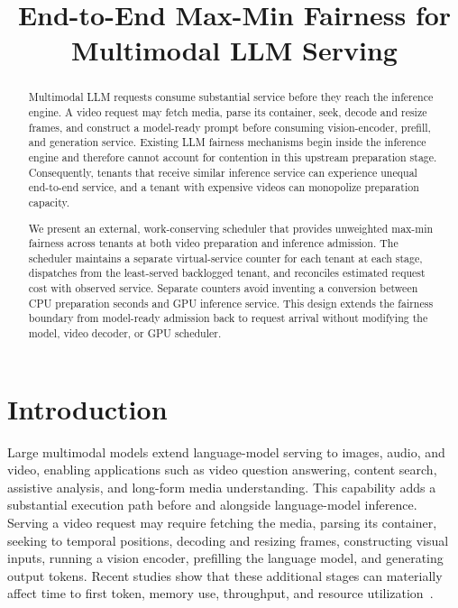 \documentclass[sigplan,anonymous,review,nonacm]{acmart}
\title{End-to-End Max-Min Fairness for Multimodal LLM Serving}
\begin{document}
\begin{abstract}
Multimodal LLM requests consume substantial service before they reach the
inference engine. A video request may fetch media, parse its container, seek,
decode and resize frames, and construct a model-ready prompt before consuming
vision-encoder, prefill, and generation service. Existing LLM fairness
mechanisms begin inside the inference engine and therefore cannot account for
contention in this upstream preparation stage. Consequently, tenants that
receive similar inference service can experience unequal end-to-end service,
and a tenant with expensive videos can monopolize preparation capacity.

We present an external, work-conserving scheduler that provides unweighted
max-min fairness across tenants at both video preparation and inference
admission. The scheduler maintains a separate virtual-service counter for
each tenant at each stage, dispatches from the least-served backlogged tenant,
and reconciles estimated request cost with observed service. Separate counters
avoid inventing a conversion between CPU preparation seconds and GPU inference
service. This design extends the fairness boundary from model-ready admission
back to request arrival without modifying the model, video decoder, or GPU
scheduler.
\end{abstract}

\maketitle

\section{Introduction}

Large multimodal models extend language-model serving to images, audio, and
video, enabling applications such as video question answering, content search,
assistive analysis, and long-form media understanding. This capability adds a
substantial execution path before and alongside language-model inference.
Serving a video request may require fetching the media, parsing its container,
seeking to temporal positions, decoding and resizing frames, constructing
visual inputs, running a vision encoder, prefilling the language model, and
generating output tokens. Recent studies show that these additional stages can
materially affect time to first token, memory use, throughput, and resource
utilization~\cite{qiu2025efficient,singh2025epd,zhao2025flashcodec}.
\end{document}
